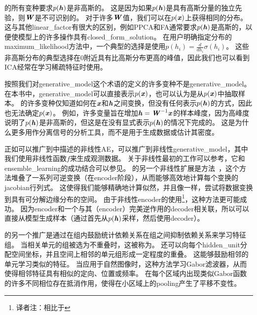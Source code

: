 的所有变种要求$p(\boldsymbol{\mathit{h}})$是非高斯的。
这是因为如果$p(\boldsymbol{\mathit{h}})$是具有高斯分量的独立先验，则$\boldsymbol{\mathit{W}}$是不可识别的。
对于许多$\boldsymbol{\mathit{W}}$值，我们可以在$p(\boldsymbol{\mathit{x}})$上获得相同的分布。 
这与其他\gls{linear_factor}有很大的区别，例如\gls{PPCA}和\gls{FA}通常要求$p(\boldsymbol{\mathit{h}})$是高斯的，以便使模型上的许多操作具有\gls{closed_form_solution}。
在用户明确指定分布的\gls{maximum_likelihood}方法中，一个典型的选择是使用$p(h_i) = \frac{d}{dh_i}\sigma(h_i)$。
这些非高斯分布的典型选择在$0$附近具有比高斯分布更高的峰值，因此我们也可以看到\gls{ICA}经常在学习稀疏特征时使用。




按照我们对\gls{generative_model}这个术语的定义的许多变种不是\gls{generative_model}。
在本书中，\gls{generative_model}可以直接表示$p(\boldsymbol{\mathit{x}})$，也可以认为是从$p(\boldsymbol{\mathit{x}})$中抽取样本。
的许多变种仅知道如何在$\boldsymbol{\mathit{x}}$和$\boldsymbol{\mathit{h}}$之间变换，但没有任何表示$p(\boldsymbol{\mathit{h}})$的方式，因此也无法确定$p(\boldsymbol{\mathit{x}})$。
例如，许多变量旨在增加$\boldsymbol{\mathit{h}} = \boldsymbol{\mathit{W}}^{-1}\boldsymbol{\mathit{x}}$的样本峰度，因为高峰度说明了$p(\boldsymbol{\mathit{h}})$是非高斯的，但这是在没有显式表示$p(\boldsymbol{\mathit{h}})$的情况下完成的。
这是为什么更多用作分离信号的分析工具，而不是用于生成数据或估计其密度。


正如可以推广到中描述的非线性\gls{AE}，可以推广到非线性\gls{generative_model}，其中我们使用非线性函数$f$来生成观测数据。
关于非线性最初的工作可以参考\citet{hyvarinen1999nonlinear}，它和\gls{ensemble_learning}的成功结合可以参见\citet{roberts2001independent,lappalainen2000nonlinear}。
的另一个非线性扩展是方法~\citep{Dinh-et-al-arxiv2014}，这个方法堆叠了一系列可逆变换（在\gls{encoder}阶段），从而能够高效地计算每个变换的\gls{jacobian}行列式。
这使得我们能够精确地计算似然，并且像一样，尝试将数据变换到具有可分解边缘分布的空间。
由于非线性\gls{encoder}的使用\footnote{译者注：相比于}，这种方法更可能成功。
因为\gls{encoder}和一个与其（\gls{encoder}）完美逆作用的\gls{decoder}相关联，所以可以直接从模型生成样本（通过首先从$p(\boldsymbol{\mathit{h}})$采样，然后使用\gls{decoder}）。


的另一个推广是通过在组内鼓励统计依赖关系在组之间抑制依赖关系来学习特征组。
当相关单元的组被选为不重叠时，这被称为。
还可以向每个\gls{hidden_unit}分配空间坐标，并且空间上相邻的单元组形成一定程度的重叠。
这能够鼓励相邻的单元学习类似的特征。
当应用于自然图像时，这种方法学习Gabor滤波器，从而使得相邻特征具有相似的定向、位置或频率。
在每个区域内出现类似Gabor函数的许多不同相位存在抵消作用，使得在小区域上的\gls{pooling}产生了平移不变性。


